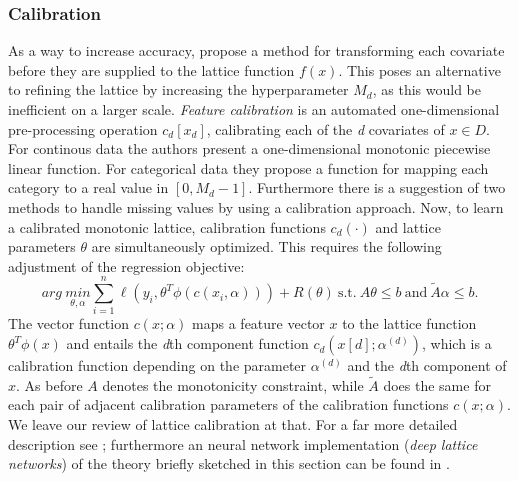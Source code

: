\subsubsection{Calibration}\label{Sec:cal}

As a way to increase accuracy, \citep{gupta2016monotonic} propose a method for transforming each covariate before they are supplied to the lattice function $f(x)$. This poses an alternative to refining the lattice by increasing the hyperparameter $M_d$, as this would be inefficient on a larger scale. \textit{Feature calibration} is an automated one-dimensional pre-processing operation $c_d[x_d]$, calibrating each of the \textit{d} covariates of $x \in D$. For continous data the authors present a one-dimensional monotonic piecewise linear function. For categorical data they propose a function for mapping each category to a real value in $[0, M_d - 1]$. Furthermore there is a suggestion of two methods to handle missing values by using a calibration approach. Now, to learn a calibrated monotonic lattice, calibration functions $c_d(\cdot)$ and lattice parameters $\theta$ are simultaneously optimized. This requires the following adjustment of the regression objective:
\begin{equation}
arg\ \underset{\theta, \alpha}{min} \sum_{i = 1}^{n} \ell(y_i, \theta^T \phi(c(x_i, \alpha))) + R(\theta)\ 
\mathrm{s.t.}\ A\theta \leq b\ \mathrm{and}\ \tilde{A}\alpha \leq b.
\label{Eq:calregobj}
\end{equation}
The vector function $c(x;\alpha)$ maps a feature vector $x$ to the lattice function $\theta^T\phi(x)$ and entails the \textit{d}th component function $c_d(x[d];\alpha^{(d)})$, which is a calibration function depending on the parameter $\alpha^{(d)}$ and the \textit{d}th component of $x$. As before $A$ denotes the monotonicity constraint, while $\tilde{A}$ does the same for each pair of adjacent calibration parameters of the calibration functions  $c(x;\alpha)$. We leave our review of lattice calibration at that. For a far more detailed description see \cite{gupta2016monotonic}; furthermore an neural network implementation (\textit{deep lattice networks}) of the theory briefly sketched in this section can be found in \citep{you2017deep}. 